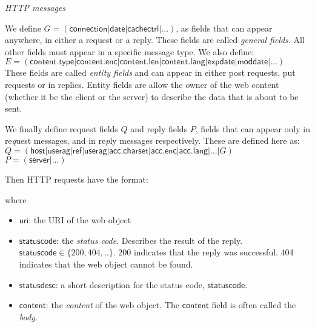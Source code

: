 \frmrule 

\textit{HTTP messages}

We define $G = (\mathsf{connection} | \mathsf{date} | \mathsf{cachectrl} | ... )$, 
as fields that can appear anywhere, in either a request or a reply. 
These fields are called \textit{general fields}. All other fields must appear in a specific message type. 
We also define:\\
$E = (\mathsf{content.type} | \mathsf{content.enc} | \mathsf{content.len} 
| \mathsf{content.lang} | \mathsf{expdate} | \mathsf{moddate} | ...)$ \\
These fields are called \textit{entity fields} 
and can appear in either post requests, put requests or in 
replies. Entity fields are allow the owner of the web content (whether it be 
the client or the server) to describe the data that is about to be sent.

We finally define request fields $Q$ and reply fields $P$, 
fields that can appear only in re\textit{q}uest messages,
and in re\textit{p}ly messages respectively. These are defined here as: \\
$Q = (\mathsf{host} | \mathsf{userag} | \mathsf{ref} | \mathsf{userag} | \mathsf{acc.charset} 
| \mathsf{acc.enc} | \mathsf{acc.lang}  | ... | G)$\\
$P = (\mathsf{server} | ...)$

Then HTTP requests have the format:


where
\begin{itemize}[nosep]
\renewcommand{\labelitemi}{$\Box$}
\item $\mathsf{uri}$: the URI of the web object
\item $\mathsf{statuscode}$: the \textit{status code}. Describes the result of the reply. 
$\mathsf{statuscode} \in \{200,404, .. \} $. 200 indicates that the reply was 
successful. 404 indicates that the web object cannot be found.
\item $\mathsf{statusdesc}$: a short description for the status code, $\mathsf{statuscode}$.
\item $\mathsf{content}$: the \textit{content} of the web object. 
The $\mathsf{content}$ field is often called the \textit{body}.
\end{itemize}

